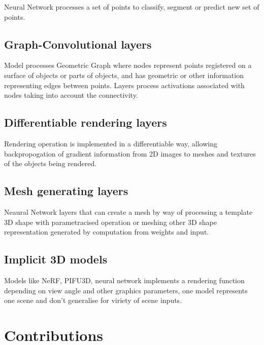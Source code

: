 Neural Network processes a set of points to classify, segment or predict new set of points.

\subsection{Graph-Convolutional layers}

Model processes Geometric Graph where nodes represent points registered on a surface of objects or parts of objects, and has geometric or other information representing edges between points. Layers process activations associated with nodes taking into account the connectivity.

\subsection{Differentiable rendering layers}

Rendering operation is implemented in a differentiable way, allowing backpropogation of gradient information from 2D images to meshes and textures of the objects being rendered.

\subsection{Mesh generating layers}

Neaural Network layers that can create a mesh by way of processing a template 3D shape with parametracised operation or meshing other 3D shape representation generated by computation from weights and input.

\subsection{Implicit 3D models}

Models like NeRF, PIFU3D, neural network implements a rendering function depending on view angle and other graphics parameters, one model represents one scene and don't generalise for viriety of scene inputs.

\section{Contributions}

 


